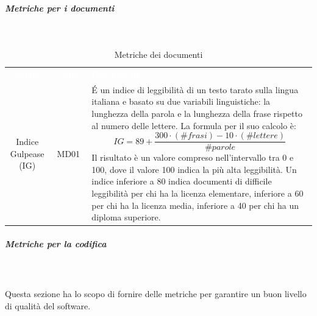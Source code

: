 \pagebreak
\subparagraph{Metriche per i documenti}\mbox{} \\ 
\begin{table}[H]
\caption{Metriche dei documenti}
	\begin{center}
	\begin{tabular}{ c | c | L{10cm} }
		\textcolor{white}{\textbf{Nome}} & \textcolor{white}{\textbf{Codice}} & \centerline{\textcolor{white}{\textbf{Descrizione}}} \\
		Indice Gulpease (IG)  & MD01 & \'E un indice di leggibilità di un testo tarato sulla lingua italiana e basato su due variabili linguistiche: la lunghezza della parola e la lunghezza della frase rispetto al numero delle lettere. La formula per il suo calcolo è: \newline
\[ IG = 89 + \frac{300 \cdot (\#frasi) - 10 \cdot (\#lettere)}{\#parole} \] \newline
Il risultato è un valore compreso nell'intervallo tra 0 e 100, dove il valore 100 indica la più alta leggibilità. Un indice inferiore a 80 indica documenti di difficile leggibilità per chi ha la licenza elementare, inferiore a 60 per chi ha la licenza media, inferiore a 40 per chi ha un diploma superiore.
	\\
	\end{tabular}
	\end{center}	
	\end{table}
\pagebreak
\subparagraph{Metriche per la codifica} \mbox{} \\ \mbox{} \\
Questa sezione ha lo scopo di fornire delle metriche per garantire un buon livello di qualità del software.
